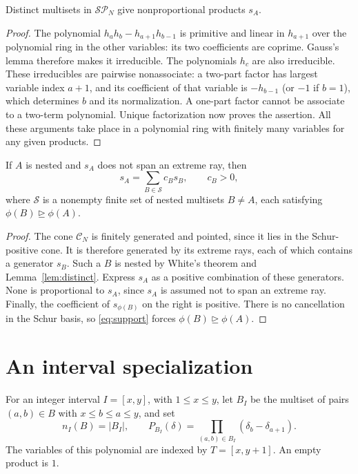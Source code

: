 \documentclass[11pt]{amsart}
\renewcommand{\C}{\mathcal C}
\newcommand{\SP}{\mathcal{SP}}
\newcommand{\dom}{\trianglerighteq}
\begin{document}
\begin{lemma}\label{lem:distinct}
Distinct multisets in $\SP_N$ give nonproportional products $s_A$.
\end{lemma}
\begin{proof}
The polynomial $h_ah_b-h_{a+1}h_{b-1}$ is primitive and linear in
$h_{a+1}$ over the polynomial ring in the other variables: its two
coefficients are coprime. Gauss's lemma therefore makes it irreducible.
The polynomials $h_c$ are also irreducible. These irreducibles are
pairwise nonassociate: a two-part factor has largest variable index
$a+1$, and its coefficient of that variable is $-h_{b-1}$ (or $-1$ if
$b=1$), which determines $b$ and its normalization. A one-part factor
cannot be associate to a two-term polynomial. Unique factorization now
proves the assertion. All these arguments take place in a polynomial
ring with finitely many variables for any given products.
\end{proof}

\begin{lemma}\label{lem:reduction}
If $A$ is nested and $s_A$ does not span an extreme ray, then
\begin{equation}\label{eq:decomp}
 s_A=\sum_{B\in\mathcal S}c_Bs_B,
 \qquad c_B>0,
\end{equation}
where $\mathcal S$ is a nonempty finite set of nested multisets
$B\ne A$, each satisfying $\phi(B)\dom\phi(A)$.
\end{lemma}
\begin{proof}
The cone $\C_N$ is finitely generated and pointed, since it lies in the
Schur-positive cone. It is therefore generated by its extreme rays,
each of which contains a generator $s_B$. Such a $B$ is nested by
White's theorem and Lemma~\ref{lem:distinct}. Express $s_A$ as a
positive combination of these generators. None is proportional to
$s_A$, since $s_A$ is assumed not to span an extreme ray.
Finally, the coefficient of $s_{\phi(B)}$ on the right is positive.
There is no cancellation in the Schur basis, so
\eqref{eq:support} forces $\phi(B)\dom\phi(A)$.
\end{proof}

\section{An interval specialization}

For an integer interval $I=[x,y]$, with $1\le x\le y$, let $B_I$
be the multiset of pairs $(a,b)\in B$ with $x\le b\le a\le y$, and set
\[
 n_I(B)=|B_I|,
 \qquad
 P_{B_I}(\delta)=\prod_{(a,b)\in B_I}(\delta_b-\delta_{a+1}).
\]
The variables of this polynomial are indexed by $T=[x,y+1]$.
An empty product is $1$.
\end{document}

